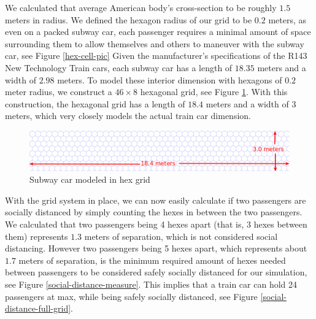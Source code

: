 \documentclass[12pt]{article}
\begin{document}
We calculated that average American body's cross-section to be roughly $1.5$ meters in radius.
We defined the hexagon radius of our grid to be $0.2$ meters, as even on a packed subway car, each passenger requires a minimal amount of space surrounding them to allow themselves and others to maneuver with the subway car, see Figure \ref{hex-cell-pic}
Given the manufacturer's specifications of the R143 New Technology Train cars, each subway car has a length of $18.35$ meters and a width of $2.98$ meters.
To model these interior dimension with hexagons of $0.2$ meter radius, we construct a $46 \times 8$ hexagonal grid, see Figure \ref{hex-grid-dimensions}.
With this construction, the hexagonal grid has a length of $18.4$ meters and a width of $3$ meters, which very closely models the actual train car dimension. 

\begin{figure}[h]
	\centering
	\includegraphics[scale=.45]{./figures/hex-train-dims.png}
	\caption{Subway car modeled in hex grid}
	\label{hex-grid-dimensions}
\end{figure}

With the grid system in place, we can now easily calculate if two passengers are socially distanced by simply counting the hexes in between the two passengers.
We calculated that two passengers being 4 hexes apart (that is, 3 hexes between them) represents $1.3$ meters of separation, which is not considered social distancing.
However two passengers being 5 hexes apart, which represents about $1.7$ meters of separation, is the minimum required amount of hexes needed between passengers to be considered safely socially distanced for our simulation, see Figure \ref{social-distance-measure}.
This implies that a train car can hold 24 passengers at max, while being safely socially distanced, see Figure \ref{social-distance-full-grid}.
\end{document}
